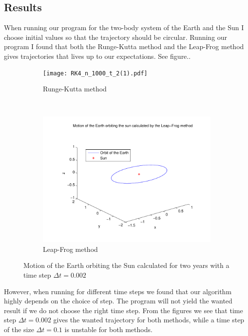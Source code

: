 \documentclass[a4paper,12pt, english]{article}
\begin{document}
   
\subsection*{Results}

When running our program for the two-body system of the Earth and the Sun I choose initial values so that the trajectory should be circular. Running our program I found that both the Runge-Kutta method and the Leap-Frog method gives trajectories that lives up to our expectations. See figure..

\begin{figure}
        \centering
        \begin{subfigure}[b]{0.8\textwidth}
                \texttt{[image: RK4\_n\_1000\_t\_2(1).pdf]}
                \caption{Runge-Kutta method}
                \label{fig:RK4_dt_0.002}
        \end{subfigure}%
        ~ %
        \begin{subfigure}[b]{0.8\textwidth}
                \includegraphics[width=\textwidth]{LF_n_1000_t_2.pdf}
                \caption{Leap-Frog method}
                \label{fig:LF_dt_0.002}
        \end{subfigure}
        \caption{Motion of the Earth orbiting the Sun calculated for two years with a time step $\Delta t = 0.002$}
    
\end{figure}

However, when running for different time steps we found that our algorithm highly depends on the choice of step. The program will not yield the wanted result if we do not choose the right time step. From the figures we see that time step $\Delta t = 0.002$ gives the wanted trajectory for both methods, while a time step of the size $\Delta t = 0.1$ is unstable for both methods. 
\end{document}
